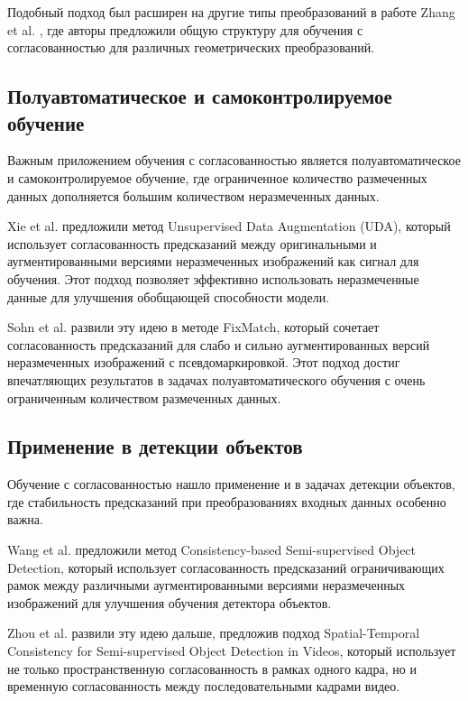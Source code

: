 Подобный подход был расширен на другие типы преобразований в работе Zhang et al. \cite{Zhang2020}, где авторы предложили общую структуру для обучения с согласованностью для различных геометрических преобразований.

\subsection{Полуавтоматическое и самоконтролируемое обучение}
\label{review:consistency:semi_self}

Важным приложением обучения с согласованностью является полуавтоматическое и самоконтролируемое обучение, где ограниченное количество размеченных данных дополняется большим количеством неразмеченных данных.

Xie et al. \cite{Xie2020} предложили метод Unsupervised Data Augmentation (UDA), который использует согласованность предсказаний между оригинальными и аугментированными версиями неразмеченных изображений как сигнал для обучения. Этот подход позволяет эффективно использовать неразмеченные данные для улучшения обобщающей способности модели.

Sohn et al. \cite{Sohn2020} развили эту идею в методе FixMatch, который сочетает согласованность предсказаний для слабо и сильно аугментированных версий неразмеченных изображений с псевдомаркировкой. Этот подход достиг впечатляющих результатов в задачах полуавтоматического обучения с очень ограниченным количеством размеченных данных.

\subsection{Применение в детекции объектов}
\label{review:consistency:detection}

Обучение с согласованностью нашло применение и в задачах детекции объектов, где стабильность предсказаний при преобразованиях входных данных особенно важна.

Wang et al. \cite{Wang2021} предложили метод Consistency-based Semi-supervised Object Detection, который использует согласованность предсказаний ограничивающих рамок между различными аугментированными версиями неразмеченных изображений для улучшения обучения детектора объектов.

Zhou et al. \cite{Zhou2021} развили эту идею дальше, предложив подход Spatial-Temporal Consistency for Semi-supervised Object Detection in Videos, который использует не только пространственную согласованность в рамках одного кадра, но и временную согласованность между последовательными кадрами видео.

